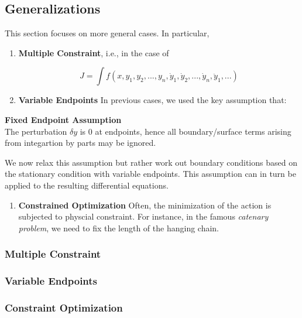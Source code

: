 \subsection{Generalizations}

This section focuses on more general cases. In particular,

\begin{enumerate}
\item \textbf{Multiple Constraint}, i.e., in the case of

\begin{equation}
J=\int f(x,y_1,y_2,...,y_n,\dot y_1, \dot y_2,...,\dot y_n, \ddot y_1,...)
\end{equation}


\item \textbf{Variable Endpoints}
In previous cases, we used the key assumption that:
\end{enumerate}

\begin{framed}
\textbf{Fixed Endpoint Assumption}\\
The perturbation $\delta y$ is 0 at endpoints, hence all boundary/surface terms arising from integartion by parts may be ignored.
\end{framed}

We now relax this assumption but rather work out boundary conditions based on the stationary condition with variable endpoints. This assumption can in turn be applied to the resulting differential equations.

\begin{enumerate}[resume]
\item \textbf{Constrained Optimization} Often, the minimization of the action is subjected to physcial constraint. For instance, in the famous \textit{catenary problem}, we need to fix the length of the hanging chain.
\end{enumerate}

\subsubsection{Multiple Constraint}

\subsubsection{Variable Endpoints}

\subsubsection{Constraint Optimization}


